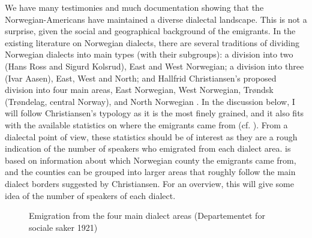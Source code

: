 \documentclass[output=paper]{langscibook}
\begin{document}
We have many testimonies and much documentation showing that the Norwegian\hyp Americans have maintained a diverse dialectal landscape. This is not a surprise, given the social and geographical background of the emigrants. In the existing literature on Norwegian dialects, there are several traditions of dividing Norwegian dialects into main types (with their subgroups): a division into two (Hans Ross and Sigurd Kolsrud), East and West Norwegian; a division into three (Ivar Aasen), East, West and North; and Hallfrid Christiansen’s proposed division into four main areas, East Norwegian, West Norwegian, Trøndsk (Trøndelag, central Norway), and North Norwegian \citep{Christiansen1954}. In the discussion below, I will follow Christiansen’s typology as it is the most finely grained, and it also fits with the available statistics on where the emigrants came from (cf. ). From a dialectal point of view, these statistics should be of interest as they are a rough indication of the number of speakers who emigrated from each dialect area.  is based on information about which Norwegian county the emigrants came from, and the counties can be grouped into larger areas that roughly follow the main dialect borders suggested by Christiansen. For an overview, this will give some idea of the number of speakers of each dialect.  

  
  

\begin{figure}
\HjeldeFigureThreeData
\small
{}
\caption{Emigration from the four main dialect areas (Departementet for sociale saker 1921)}
\label{tab:hjelde:5}
\end{figure}
\end{document}
